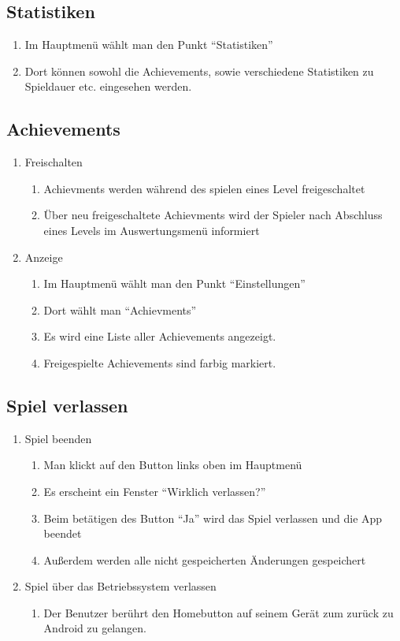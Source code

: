 \documentclass{scrartcl}
\begin{document}
\subsection{Statistiken} \label{szenarien:statistik}
	\begin{enumerate}
		\item Im Hauptmenü wählt man den Punkt \enquote{Statistiken}
		\item Dort können sowohl die Achievements, sowie verschiedene Statistiken zu Spieldauer etc. eingesehen werden.
	\end{enumerate}

\subsection{Achievements} \label{szenarien:achievements}
 \begin{enumerate}
 	\item Freischalten
 		\begin{enumerate}
 			\item Achievments werden während des spielen eines Level freigeschaltet
 			\item Über neu freigeschaltete Achievments wird der Spieler nach Abschluss eines Levels im Auswertungsmenü informiert
 		\end{enumerate}
 	\item Anzeige
 	 	\begin{enumerate}
 	 		\item Im Hauptmenü wählt man den Punkt \enquote{Einstellungen}
 	 		\item Dort wählt man \enquote{Achievments}
 	 		\item Es wird eine Liste aller Achievements angezeigt.
 	 		\item Freigespielte Achievements sind farbig markiert. 
 		\end{enumerate}
 \end{enumerate}

\subsection{Spiel verlassen} \label{szenarien:quit_game}
	\begin{enumerate}
		\item Spiel beenden
			\begin{enumerate}
				\item Man klickt auf den Button links oben im Hauptmenü
				\item Es erscheint ein Fenster \enquote{Wirklich verlassen?}
				\item Beim betätigen des Button \enquote{Ja} wird das Spiel verlassen und die App beendet
				\item Außerdem werden alle nicht gespeicherten Änderungen gespeichert
			\end{enumerate}
		\item Spiel über das Betriebssystem verlassen
			\begin{enumerate}
				\item Der Benutzer berührt den Homebutton auf seinem Gerät zum zurück zu Android zu gelangen.
			\end{enumerate}
	\end{enumerate}
\end{document}
